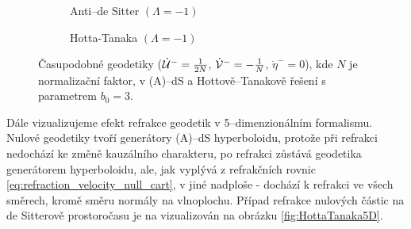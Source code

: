 \begin{figure}[ht]
    \begin{subfigure}[b]{0.48\textwidth}
        \caption{Anti--de Sitter $(\Lambda = -1)$}
    \end{subfigure}
    \hfill
    \begin{subfigure}[b]{0.48\textwidth}
        \caption{Hotta-Tanaka $(\Lambda = -1)$}
    \end{subfigure}
    \caption{Časupodobné geodetiky ($\dot {\mathcal{U}}^-=\frac{1}{2N}$, $\dot {\mathcal{V}}^-=-\frac{1}{N}$, $\dot \eta^-=0$), kde $N$ je normalizační faktor, v (A)--dS a Hottově--Tanakově řešení s parametrem $b_0 = 3$.}
    \label{fig:HottaTanakaMatter}
\end{figure}

Dále vizualizujeme efekt refrakce geodetik v 5--dimenzionálním formalismu. Nulové geodetiky tvoří generátory (A)--dS hyperboloidu, protože při refrakci nedochází
ke změně kauzálního charakteru, po refrakci zůstává geodetika generátorem hyperboloidu, ale, jak vyplývá z refrakčních rovnic \eqref{eq:refraction_velocity_null_cart}, v jiné nadploše - dochází k refrakci
ve všech směrech, kromě směru normály na vlnoplochu. Případ refrakce nulových částic na de Sitterově prostoročasu je na vizualizován na obrázku \ref{fig:HottaTanaka5D}.

